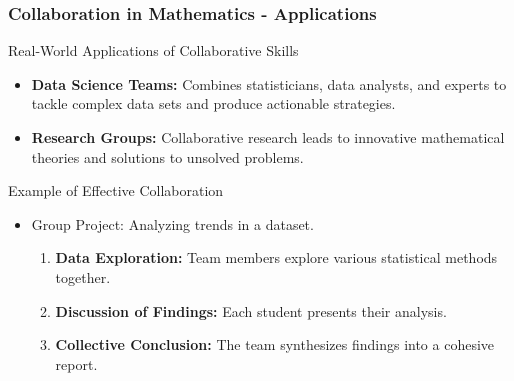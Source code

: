 \documentclass[aspectratio=169]{beamer}
\begin{document}
\begin{frame}[fragile]
    \frametitle{Collaboration in Mathematics - Applications}
    
    \begin{block}{Real-World Applications of Collaborative Skills}
        \begin{itemize}
            \item \textbf{Data Science Teams:} Combines statisticians, data analysts, and experts to tackle complex data sets and produce actionable strategies.
            \item \textbf{Research Groups:} Collaborative research leads to innovative mathematical theories and solutions to unsolved problems.
        \end{itemize}
    \end{block}
    
    \begin{block}{Example of Effective Collaboration}
        \begin{itemize}
            \item Group Project: Analyzing trends in a dataset.
            \begin{enumerate}
                \item \textbf{Data Exploration:} Team members explore various statistical methods together.
                \item \textbf{Discussion of Findings:} Each student presents their analysis.
                \item \textbf{Collective Conclusion:} The team synthesizes findings into a cohesive report.
            \end{enumerate}
        \end{itemize}
    \end{block}
\end{frame}
\end{document}
